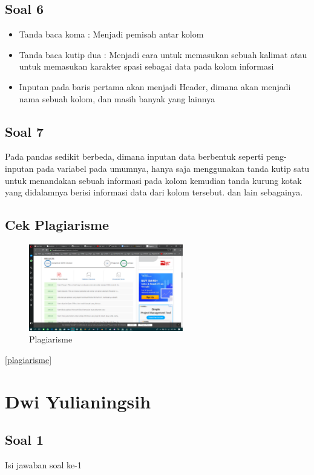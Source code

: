	\subsection{Soal 6}
		\begin {itemize} 
			\item Tanda baca koma : Menjadi pemisah antar kolom
			\item Tanda baca kutip dua : Menjadi cara untuk memasukan sebuah kalimat atau untuk memasukan karakter spasi sebagai data pada kolom informasi
			\item Inputan pada baris pertama akan menjadi Header, dimana akan menjadi nama sebuah kolom, dan masih banyak yang lainnya
		\end{itemize}
	
	\subsection{Soal 7}
	Pada pandas sedikit berbeda, dimana inputan data berbentuk seperti peng-inputan pada variabel pada umumnya, hanya saja menggunakan tanda kutip satu untuk menandakan sebuah informasi pada kolom kemudian tanda kurung kotak yang didalamnya berisi informasi data dari kolom tersebut. dan lain sebagainya.
	
	\subsection{Cek Plagiarisme}
	\begin{figure} [ht]
		\centerline{\includegraphics[width=0.6\textwidth]{figures/4/1174043/Teori/plagiarisme.png}}
		\caption{Plagiarisme}
		\label{Plagiarisme}
	\end{figure}

	\ref{plagiarisme}

\section{Dwi Yulianingsih}
\subsection{Soal 1}
Isi jawaban soal ke-1

